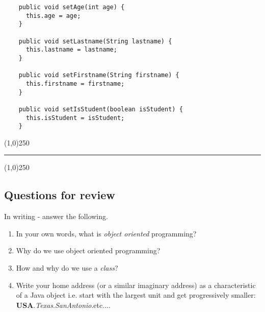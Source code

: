 \documentclass{article}
\begin{document}
\begin{flushleft}
\begin{tcolorbox}[enhanced,breakable, before upper={\let\clearpage\relax}, width=4in,center upper,
    fontupper=\bfseries,drop fuzzy shadow southeast,
    boxrule=0.4pt,sharp corners,colframe=gray!80!black,colback=gray!10]
  \begin{verbatim}
    public void setAge(int age) {
      this.age = age;
    }
    
    public void setLastname(String lastname) {
      this.lastname = lastname;
    }
    
    public void setFirstname(String firstname) {
      this.firstname = firstname;
    }
    
    public void setIsStudent(boolean isStudent) {
      this.isStudent = isStudent;
    }
  \end{verbatim}
\end{tcolorbox}


\newpage
\begin{center}
\line(1,0){250}
\end{center}
\noindent
\rule{\textwidth}{0.4pt}
\begin{center}
\line(1,0){250}
\end{center}
\subsection{{\LARGE Questions for review}}
           {\Large In writing - answer the following.}
           
\begin{enumerate}
\item In your own words, what is \emph{object oriented} programming?

\item Why do we use object oriented programming?

\item How and why do we use a \emph{class}?

\item Write your home address (or a similar imaginary address) as a characteristic of a Java object i.e. start with the largest unit and get progressively smaller: \textbf{USA}.\emph{Texas}.\textit{SanAntonio}.etc.... 


\end{enumerate}
\end{flushleft}
\end{document}
